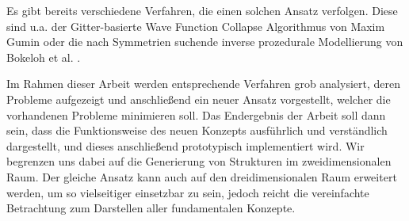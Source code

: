 Es gibt bereits verschiedene Verfahren, die einen solchen Ansatz verfolgen. Diese sind u.a. der Gitter-basierte Wave Function
Collapse Algorithmus von Maxim Gumin \cite{45_gumin} oder die nach Symmetrien suchende inverse prozedurale Modellierung von Bokeloh
et al. \cite{3_bokeloh_et_al}.

Im Rahmen dieser Arbeit werden entsprechende Verfahren grob analysiert, deren Probleme aufgezeigt und anschließend ein neuer Ansatz vorgestellt,
welcher die vorhandenen Probleme minimieren soll. Das Endergebnis der Arbeit soll dann sein, dass die Funktionsweise des neuen Konzepts
ausführlich und verständlich dargestellt, und dieses anschließend prototypisch implementiert wird. Wir begrenzen uns dabei auf die Generierung von
Strukturen im zweidimensionalen Raum. Der gleiche Ansatz kann auch auf den dreidimensionalen Raum erweitert werden, um so vielseitiger einsetzbar zu
sein, jedoch reicht die vereinfachte Betrachtung zum Darstellen aller fundamentalen Konzepte.